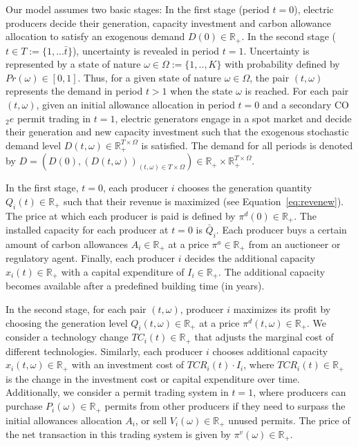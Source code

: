 \documentclass[11pt, letterpaper]{article}
\begin{document}
\smallskip

Our model assumes two basic stages: In the first stage (period $t=0$), electric producers decide their generation, capacity investment and carbon allowance allocation to satisfy an exogenous demand $D(0)\in\mathbb{R}_+$. In the second stage ($t\in T:=\{1,...\bar{t}\}$), uncertainty is revealed in period $t=1$. Uncertainty is represented by a state of nature $\omega\in\Omega:=\{1,..,K\}$ with probability defined by $Pr(\omega)\in[0,1]$. Thus, for a given state of nature $\omega\in\Omega$, the pair $(t,\omega)$ represents the demand in period $t>1$ when the state $\omega$ is reached. For each pair $(t,\omega)$, given an initial allowance allocation in period $t=0$ and a secondary CO$_2e$ permit trading in $t=1$, electric generators engage in a spot market and decide their generation and new capacity investment such that the exogenous stochastic demand level $D(t,\omega)\in\mathbb{R}_+^{T\times\Omega}$ is satisfied. The demand for all periods is denoted by $D=\left(D(0),(D(t,\omega))_{(t,\omega)\in T\times\Omega}\right)\in\mathbb{R}_+\times\mathbb{R}_+^{T\times\Omega}$.

\smallskip
In the first stage, $t=0$, each producer $i$ chooses the generation quantity $Q_i(t)\in\mathbb{R}_+$ such that their revenue is maximized (see Equation~\ref{eq:revenew}). The price at which each producer is paid is defined by $\pi^d(0)\in\mathbb{R}_+$. The installed capacity for each producer at $t=0$ is $\bar{Q}_i$. Each producer buys a certain amount of carbon allowances $A_i\in\mathbb{R}_+$ at a price $\pi^{a}\in\mathbb{R}_+$ from an auctioneer or regulatory agent. Finally, each producer $i$ decides the additional capacity $x_i(t)\in\mathbb{R}_+$ with a capital expenditure of $I_i\in\mathbb{R}_+$. The additional capacity becomes available after a predefined building time (in years). 

\smallskip
In the second stage, for each pair $(t,\omega)$, producer $i$ maximizes its profit by choosing the generation level $Q_i(t,\omega)\in\mathbb{R}_+$ at a price $\pi^d(t,\omega)\in\mathbb{R}_+$. We consider a technology change $TC_i(t) \in\mathbb{R}_+$ that adjusts the marginal cost of different technologies. Similarly, each producer $i$ chooses additional capacity $x_i(t,\omega)\in\mathbb{R}_+$ with an investment cost of $TCR_i(t)\cdot I_i$, where $TCR_i(t)\in\mathbb{R}_+$ is the change in the investment cost or capital expenditure over time. Additionally, we consider a permit trading system in $t=1$, where producers can purchase $P_i(\omega)\in\mathbb{R}_+$ permits from other producers if they need to surpass the initial allowances allocation $A_i$, or sell $V_i(\omega)\in\mathbb{R}_+$ unused permits. The price of the net transaction in this trading system is given by $\pi^v(\omega)\in\mathbb{R}_+$.
\end{document}
